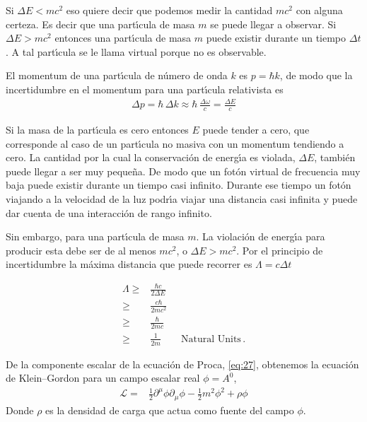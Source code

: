 Si $\Delta E< mc^2$ eso quiere decir que podemos medir la cantidad $mc^2$ con alguna certeza. Es decir que una part\'\i cula de masa $m$ se puede llegar a observar. Si $\Delta E>mc^2$ entonces una part\'\i cula de masa $m$ puede existir durante un tiempo $\Delta t$. A tal part\'\i cula se le llama virtual porque no es observable. 

El momentum de una part\'\i cula de n\'umero de onda $k$ es $p=\hbar k$, de modo que la incertidumbre en el momentum para una part\'\i cula relativista es
\begin{align}
  \Delta p=\hbar\, \Delta k \approx\hbar\, \frac{\Delta\omega}{c}=\frac{\Delta E}{c}
\end{align}

Si la masa de la part\'\i cula es cero entonces $E$ puede tender a cero, que corresponde al caso de un part\'\i cula no masiva con un momentum tendiendo a cero. La cantidad por la cual la conservaci\'on de energ\'\i a es violada, $\Delta E$, tambi\'en puede llegar a ser muy peque\~na. De modo que un fot\'on virtual de frecuencia muy baja puede existir durante un tiempo casi infinito. Durante ese tiempo un fot\'on viajando a la velocidad de la luz podr\'\i a viajar una distancia casi infinita y puede dar cuenta de una interacci\'on de rango infinito. 

Sin embargo, para una part\'\i cula de masa $m$. La violaci\'on de energ\'\i a para producir esta debe ser de al menos $mc^2$, o $\Delta E>mc^2$. Por el principio de incertidumbre la m\'axima distancia que puede recorrer es $\Lambda=c\Delta t$

\begin{align}
\label{eq:244}
  \Lambda \geq & \frac{\hbar c}{2\Delta E}\nonumber\\
  \geq &\frac{c\hbar}{2mc^2}\nonumber\\
  \geq &\frac{\hbar}{2mc}\nonumber\\
  \geq &\frac{1}{2m}\qquad\text{Natural Units} \,.
\end{align}

De la componente escalar de la ecuaci\'on de Proca, \eqref{eq:27}, obtenemos la ecuaci\'on de Klein--Gordon para un campo escalar real $\phi=A^0$,
\begin{align}
  \label{eq:29}
  \mathcal{L}=&\frac{1}{2}\partial^\mu\phi\partial_\mu\phi-\frac{1}{2}m^2\phi^2+\rho\phi
\end{align}
Donde $\rho$ es la densidad de carga que actua como fuente del campo $\phi$.

